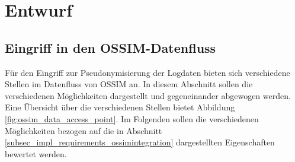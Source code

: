 \section{Entwurf}

\label{sec_impl_architecture}


\subsection{Eingriff in den OSSIM-Datenfluss}


Für den Eingriff zur Pseudonymisierung der Logdaten bieten sich verschiedene Stellen im Datenfluss von OSSIM an. In diesem Abschnitt sollen die verschiedenen Möglichkeiten dargestellt und gegeneinander abgewogen werden. Eine Übersicht über die verschiedenen Stellen bietet Abbildung \ref{fig:ossim_data_access_point}. Im Folgenden sollen die verschiedenen Möglichkeiten bezogen auf die in Abschnitt \ref{subsec_impl_requirements_ossimintegration} dargestellten Eigenschaften bewertet werden.


